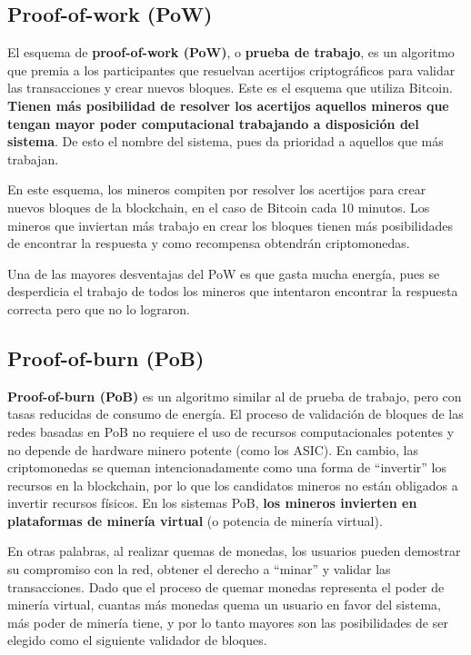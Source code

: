 \documentclass[10pt, a4paper]{article}
\theoremstyle{theorem-style}
\theoremstyle{theorem-style}
\theoremstyle{definition-style}
\theoremstyle{remark-style}
\theoremstyle{example-style}
\theoremstyle{definition-style}
\theoremstyle{remark-style}
\begin{document}
\subsection{Proof-of-work (PoW)}

El esquema de \textbf{proof-of-work (PoW)}, o \textbf{prueba de trabajo}, es un algoritmo que premia a los participantes que resuelvan acertijos criptográficos para validar las transacciones y crear nuevos bloques. Este es el esquema que utiliza Bitcoin. \textbf{Tienen más posibilidad de resolver los acertijos aquellos mineros que tengan mayor poder computacional trabajando a disposición del sistema}. De esto el nombre del sistema, pues da prioridad a aquellos que más trabajan.

En este esquema, los mineros compiten por resolver los acertijos para crear nuevos bloques de la blockchain, en el caso de Bitcoin cada 10 minutos. Los mineros que inviertan más trabajo en crear los bloques tienen más posibilidades de encontrar la respuesta y como recompensa obtendrán criptomonedas.

Una de las mayores desventajas del PoW es que gasta mucha energía, pues se desperdicia el trabajo de todos los mineros que intentaron encontrar la respuesta correcta pero que no lo lograron.

\subsection{Proof-of-burn (PoB)}\label{proof-of-burn}

\textbf{Proof-of-burn (PoB)} es un algoritmo similar al de prueba de trabajo, pero con tasas reducidas de consumo de energía. El proceso de validación de bloques de las redes basadas en PoB no requiere el uso de recursos computacionales potentes y no depende de hardware minero potente (como los ASIC). En cambio, las criptomonedas se queman intencionadamente como una forma de ``invertir'' los recursos en la blockchain, por lo que los candidatos mineros no están obligados a invertir recursos físicos. En los sistemas PoB, \textbf{los mineros invierten en plataformas de minería virtual} (o potencia de minería virtual).

En otras palabras, al realizar quemas de monedas, los usuarios pueden demostrar su compromiso con la red, obtener el derecho a ``minar'' y validar las transacciones. Dado que el proceso de quemar monedas representa el poder de minería virtual, cuantas más monedas quema un usuario en favor del sistema, más poder de minería tiene, y por lo tanto mayores son las posibilidades de ser elegido como el siguiente validador de bloques.
\end{document}
